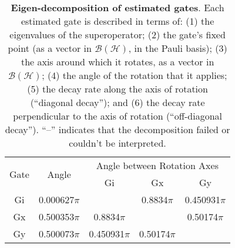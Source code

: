 {\begin{table}[h]
\begin{center}
\vspace{2em}
\begin{tabular}[l]{|c|c|c|c|c|}
\hline
\multirow{2}{*}{Gate} & \multirow{2}{*}{Angle} & \multicolumn{3}{c|}{Angle between Rotation Axes} \\ \cline{3-5}
 & & Gi & Gx & Gy \\ \hline
Gi & 0.000627$\pi$ &  & 0.8834$\pi$ & 0.450931$\pi$ \\ \hline
Gx & 0.500353$\pi$ & 0.8834$\pi$ &  & 0.50174$\pi$ \\ \hline
Gy & 0.500073$\pi$ & 0.450931$\pi$ & 0.50174$\pi$ &  \\ \hline
\end{tabular}

\caption{\textbf{Eigen-decomposition of estimated gates}.  Each estimated gate is described in terms of: (1) the eigenvalues of the superoperator; (2) the gate's fixed point (as a vector in $\mathcal{B}(\mathcal{H})$, in the Pauli basis); (3)  the axis around which it rotates, as a vector in $\mathcal{B}(\mathcal{H})$; (4) the angle of the rotation that it applies; (5) the decay rate along the axis of rotation (``diagonal decay''); and (6) the decay rate perpendicular to the axis of rotation (``off-diagonal decay'').  ``--'' indicates that the decomposition failed or couldn't be interpreted. \label{bestCPTPGatesetDecompTable}}
\end{center}
\end{table}


}
